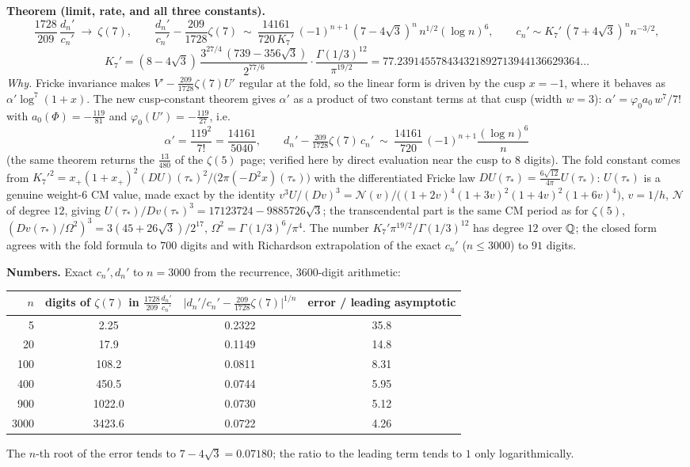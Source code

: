 \documentclass[10pt]{article}
\begin{document}
\textbf{Theorem (limit, rate, and all three constants).}
\[
\frac{1728}{209}\,\frac{d_n'}{c_n'}\ \longrightarrow\ \zeta(7),\qquad
\frac{d_n'}{c_n'}-\frac{209}{1728}\zeta(7)\ \sim\ \frac{14161}{720\,K_7'}\,(-1)^{n+1}\,(7-4\sqrt3)^n\,n^{1/2}(\log n)^6,\qquad
c_n'\sim K_7'\,(7+4\sqrt3)^n n^{-3/2},
\]
\[
\boxed{\ K_7'=(8-4\sqrt3)\,\frac{3^{27/4}\,(739-356\sqrt3)}{2^{77/6}}\cdot\frac{\Gamma(1/3)^{12}}{\pi^{19/2}}=77.239145578434321892713944136629364\ldots\ }
\]
\emph{Why.} Fricke invariance makes $V'-\frac{209}{1728}\zeta(7)U'$ regular at the fold, so the linear form is driven by the cusp $x=-1$, where it behaves as $\alpha'\log^7(1+x)$. The new cusp-constant theorem gives $\alpha'$ as a product of two constant terms at that cusp (width $w=3$): $\alpha'=\varphi_0a_0\,w^7/7!$ with $a_0(\Phi)=-\tfrac{119}{81}$ and $\varphi_0(U')=-\tfrac{119}{27}$, i.e.
\[
\alpha'=\frac{119^2}{7!}=\frac{14161}{5040},\qquad d_n'-\tfrac{209}{1728}\zeta(7)\,c_n'\ \sim\ \frac{14161}{720}\,(-1)^{n+1}\frac{(\log n)^6}{n}
\]
(the same theorem returns the $\tfrac{13}{480}$ of the $\zeta(5)$ page; verified here by direct evaluation near the cusp to $8$ digits). The fold constant comes from $K_7'^2=x_+(1+x_+)^2(DU)(\tau_*)^2/\bigl(2\pi(-D^2x)(\tau_*)\bigr)$ with the differentiated Fricke law $DU(\tau_*)=\frac{6\sqrt{12}}{4\pi}U(\tau_*)$: $U(\tau_*)$ is a genuine weight-$6$ CM value, made exact by the identity $v^3U/(Dv)^3=\mathcal N(v)/\bigl((1{+}2v)^4(1{+}3v)^2(1{+}4v)^2(1{+}6v)^4\bigr)$, $v=1/h$, $\mathcal N$ of degree $12$, giving $U(\tau_*)/Dv(\tau_*)^3=17123724-9885726\sqrt3$; the transcendental part is the same CM period as for $\zeta(5)$, $(Dv(\tau_*)/\Omega^2)^3=3(45+26\sqrt3)/2^{17}$, $\Omega^2=\Gamma(1/3)^6/\pi^4$. The number $K_7'\pi^{19/2}/\Gamma(1/3)^{12}$ has degree $12$ over $\mathbb Q$; the closed form agrees with the fold formula to $700$ digits and with Richardson extrapolation of the exact $c_n'$ ($n\le3000$) to $91$ digits.

\textbf{Numbers.} Exact $c_n',d_n'$ to $n=3000$ from the recurrence, $3600$-digit arithmetic:
\begin{center}\footnotesize
\begin{tabular}{@{}rccc@{}}\toprule
$n$ & digits of $\zeta(7)$ in $\frac{1728}{209}\frac{d_n'}{c_n'}$ & $\lvert d_n'/c_n'-\tfrac{209}{1728}\zeta(7)\rvert^{1/n}$ & error / leading asymptotic \\\midrule
5 & 2.25 & 0.2322 & 35.8\\
20 & 17.9 & 0.1149 & 14.8\\
100 & 108.2 & 0.0811 & 8.31\\
400 & 450.5 & 0.0744 & 5.95\\
900 & 1022.0 & 0.0730 & 5.12\\
3000 & 3423.6 & 0.0722 & 4.26\\\bottomrule
\end{tabular}
\end{center}
The $n$-th root of the error tends to $7-4\sqrt3=0.07180$; the ratio to the leading term tends to $1$ only logarithmically.
\end{document}
